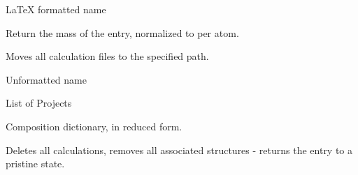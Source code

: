 \documentclass[letterpaper,10pt,english]{sphinxmanual}
\begin{document}
\begin{fulllineitems}
\begin{fulllineitems}
\label{models:qmpy.Entry.latex}
LaTeX formatted name

\end{fulllineitems}


\begin{fulllineitems}
\label{models:qmpy.Entry.mass}
Return the mass of the entry, normalized to per atom.

\end{fulllineitems}


\begin{fulllineitems}
\label{models:qmpy.Entry.move}
Moves all calculation files to the specified path.

\end{fulllineitems}


\begin{fulllineitems}
\label{models:qmpy.Entry.name}
Unformatted name

\end{fulllineitems}


\begin{fulllineitems}
\label{models:qmpy.Entry.projects}
List of Projects

\end{fulllineitems}


\begin{fulllineitems}
\label{models:qmpy.Entry.red_comp}
Composition dictionary, in reduced form.

\end{fulllineitems}


\begin{fulllineitems}
\label{models:qmpy.Entry.reset}
Deletes all calculations, removes all associated structures - returns
the entry to a pristine state.


\end{fulllineitems}
\end{fulllineitems}
\end{document}
